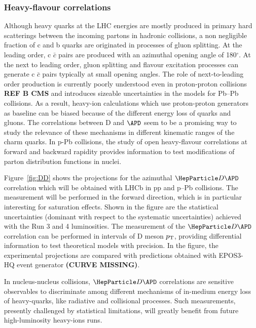 \subsubsection{Heavy-flavour correlations}
Although heavy quarks at the LHC energies are mostly produced in primary hard scatterings between the incoming partons in hadronic collisions, a non negligible fraction of c and b quarks are originated in processes of gluon splitting. At the leading order, c $\bar c$ pairs are produced with an azimuthal opening angle of 180$^\circ$. At the next to leading order, gluon splitting and flavour excitation processes can generate c $\bar c$ pairs typically at small opening angles. The role of next-to-leading order production is currently poorly understood even in proton-proton collisions\textbf{~\cite{LHCb-PAPER-2012-003} REF B CMS} and introduces sizeable uncertainties in the models for Pb--Pb collisions. As a result, heavy-ion calculations which use proton-proton generators as baseline can be biased because of the different energy loss of quarks and gluons. The correlations between D and $\APD$ seem to be a promising way to study the relevance of these mechanisms in different kinematic ranges of the charm quarks. In p-Pb collisions, the study of open heavy-flavour correlations at forward and backward rapidity provides information to test modifications of parton distribution functions in nuclei. 

Figure~\ref{fig:DD} shows the projections for the azimuthal ${\PD \APD}$ correlation which will be obtained with LHCb in pp and p--Pb collisions. The measurement will be performed in the forward direction, which is in particular interesting for saturation effects. Shown in the figure are the statistical uncertainties (dominant with respect to the systematic uncertainties) achieved with the Run 3 and 4 luminosities. The measurement of the $\PD \APD$ correlation can be performed in intervals of D meson $p_{\rm T}$, providing differential information to test theoretical models with precision. In the figure, the experimental projections are compared with predictions obtained with EPOS3-HQ event generator \textbf{(CURVE MISSING)}. 

In nucleus-nucleus collisions, ${\PD \APD}$ correlations are sensitive observables to discriminate among different mechanisms of in-medium energy loss of heavy-quarks, like radiative and collisional processes. Such measurements, presently challenged by statistical limitations, will greatly benefit from future high-luminosity heavy-ions runs. 

